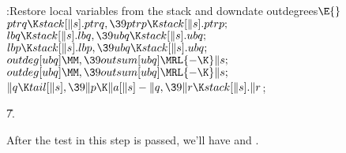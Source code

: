 \B{}:Restore local variables from the stack and downdate outdegrees\X${}%
\E{}$\6
$\\{ptrq}\K\\{stack}[\|s].\\{ptrq},\39\\{ptrp}\K\\{stack}[\|s].\\{ptrp};{}$\6
${}\\{lbq}\K\\{stack}[\|s].\\{lbq},\39\\{ubq}\K\\{stack}[\|s].\\{ubq};{}$\6
${}\\{lbp}\K\\{stack}[\|s].\\{lbp},\39\\{ubq}\K\\{stack}[\|s].\\{ubq};{}$\6
${}\\{outdeg}[\\{ubq}]\MM,\39\\{outsum}[\\{ubq}]\MRL{-{\K}}\|s;{}$\6
${}\\{outdeg}[\\{ubq}]\MM,\39\\{outsum}[\\{ubq}]\MRL{-{\K}}\|s;{}$\6
${}\|q\K\\{tail}[\|s],\39\|p\K\|a[\|s]-\|q,\39\|r\K\\{stack}[\|s].\|r{}$;\par
\U7.\fi

After the test in this step is passed, we'll have 
and .

